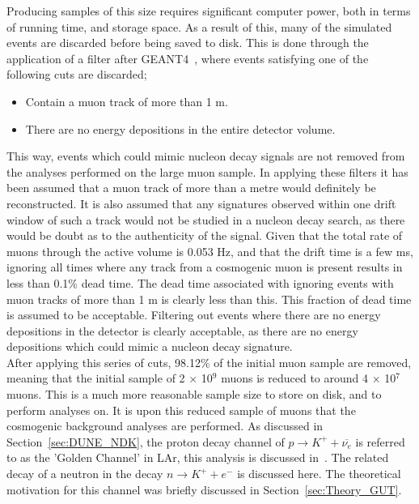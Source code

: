 Producing samples of this size requires significant computer power, both in terms of running time, and storage space. As a result of this, many of the simulated events are discarded before being saved to disk. This is done through the application of a filter after GEANT4~\citep{GEANT4}, where events satisfying one of the following cuts are discarded;
\begin{itemize}
\item Contain a muon track of more than 1 m.
\item There are no energy depositions in the entire detector volume.
\end{itemize}
This way, events which could mimic nucleon decay signals are not removed from the analyses performed on the large muon sample. In applying these filters it has been assumed that a muon track of more than a metre would definitely be reconstructed. It is also assumed that any signatures observed within one drift window of such a track would not be studied in a nucleon decay search, as there would be doubt as to the authenticity of the signal. Given that the total rate of muons through the active volume is 0.053 Hz, and that the drift time is a few ms, ignoring all times where any track from a cosmogenic muon is present results in less than 0.1\% dead time. The dead time associated with ignoring events with muon tracks of more than 1 m is clearly less than this. This fraction of dead time is assumed to be acceptable. Filtering out events where there are no energy depositions in the detector is clearly acceptable, as there are no energy depositions which could mimic a nucleon decay signature. \\

After applying this series of cuts, 98.12\% of the initial muon sample are removed, meaning that the initial sample of 2 $\times$ 10$^9$ muons is reduced to around 4 $\times$ 10$^{7}$ muons. This is a much more reasonable sample size to store on disk, and to perform analyses on. It is upon this reduced sample of muons that the cosmogenic background analyses are performed. As discussed in Section~\ref{sec:DUNE_NDK}, the proton decay channel of $p \rightarrow K^{+} + \overline{\nu_{e}}$ is referred to as the 'Golden Channel' in LAr, this analysis is discussed in~\citep{NDKTFNote}. The related decay of a neutron in the decay $n \rightarrow K^{+} + e^{-}$ is discussed here. The theoretical motivation for this channel was briefly discussed in Section~\ref{sec:Theory_GUT}. \\

